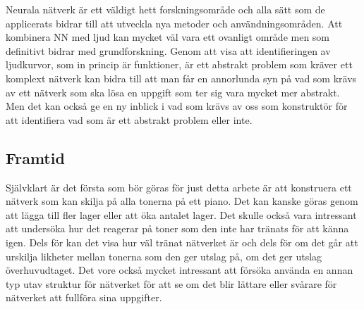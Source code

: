 \documentclass[a4paper,10pt]{article}
\begin{document}
Neurala nätverk är ett väldigt hett forskningsområde och alla sätt som de applicerats bidrar till att utveckla nya metoder och användningsområden. Att kombinera NN med ljud kan mycket väl vara ett ovanligt område men som definitivt bidrar med grundforskning. Genom att visa att identifieringen av ljudkurvor, som in princip är funktioner, är ett abstrakt problem som kräver ett komplext nätverk kan bidra till att man får en annorlunda syn på vad som krävs av ett nätverk som ska lösa en uppgift som ter sig vara mycket mer abstrakt. Men det kan också ge en ny inblick i vad som krävs av oss som konstruktör för att identifiera vad som är ett abstrakt problem eller inte.



\subsection{Framtid}

Självklart är det första som bör göras för just detta arbete är att konstruera ett nätverk som kan skilja på alla tonerna på ett piano. Det kan kanske göras genom att lägga till fler lager eller att öka antalet lager. Det skulle också vara intressant att undersöka hur det reagerar på toner som den inte har tränats för att känna igen. Dels för kan det visa hur väl tränat nätverket är och dels för om det går att urskilja likheter mellan tonerna som den ger utslag på, om det ger utslag överhuvudtaget. Det vore också mycket intressant att försöka använda en annan typ utav struktur för nätverket för att se om det blir lättare eller svårare för nätverket att fullföra sina uppgifter. 
\end{document}
